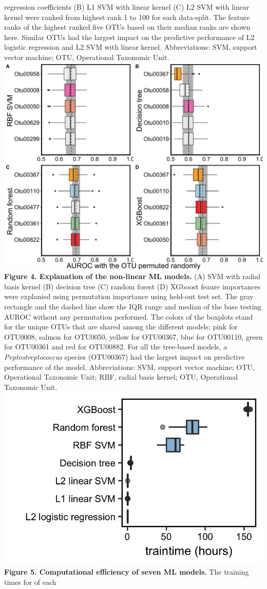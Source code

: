 \documentclass[11pt,]{article}
\begin{document}
regression coefficients (B) L1 SVM with linear kernel (C) L2 SVM with
linear kernel were ranked from highest rank 1 to 100 for each
data-split. The feature ranks of the highest ranked five OTUs based on
their median ranks are shown here. Similar OTUs had the largest impact
on the predictive performance of L2 logistic regression and L2 SVM with
linear kernel. Abbreviations: SVM, support vector machine; OTU,
Operational Taxonomic Unit. \newpage
\includegraphics{Figure_4.png} \textbf{Figure 4. Explanation of the
non-linear ML models.} (A) SVM with radial basis kernel (B) decision
tree (C) random forest (D) XGboost feaure importances were explanied
using permutation importance using held-out test set. The gray rectangle
and the dashed line show the IQR range and median of the base testing
AUROC without any permutation performed. The colors of the boxplots
stand for the unique OTUs that are shared among the different models;
pink for OTU0008, salmon for OTU0050, yellow for OTU00367, blue for
OTU00110, green for OTU00361 and red for OTU00882. For all the
tree-based models, a \emph{Peptostreptococcus} species (OTU00367) had
the largest impact on predictive performance of the model.
Abbreviations: SVM, support vector machine; OTU, Operational Taxonomic
Unit; RBF, radial basis kernel; OTU, Operational Taxonomic Unit.
\newpage
\includegraphics{Figure_5.png} \textbf{Figure 5. Computational
efficiency of seven ML models.} The training times for of each
\end{document}
